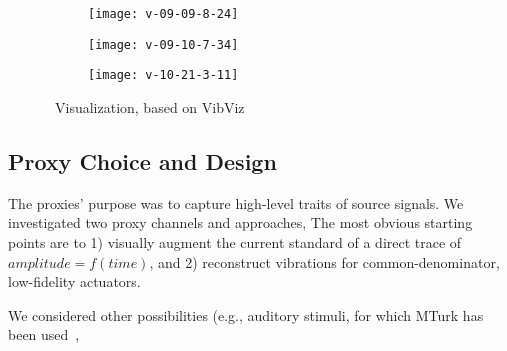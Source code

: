        \begin{figure}
        \centering
        \begin{subfigure}{0.15\textwidth}
            \centering
            \texttt{[image: v-09-09-8-24]}
        \end{subfigure}
        \begin{subfigure}{0.15\textwidth}
            \centering
            \texttt{[image: v-09-10-7-34]}
        \end{subfigure}
        \begin{subfigure}{0.15\textwidth}
            \centering
            \texttt{[image: v-10-21-3-11]}
        \end{subfigure}
        \caption{\original~Visualization, based on VibViz}
        \label{fig:vis:original}
    \end{figure}



\subsection{Proxy Choice and Design}
The proxies' purpose was to capture high-level traits of source signals. 
We investigated two proxy channels and approaches,  %
The most obvious starting points are to 
1) visually augment the current standard of a direct trace of $amplitude=f(time)$, and
2) reconstruct vibrations for common-denominator, low-fidelity actuators.

We considered other possibilities (e.g., auditory stimuli, for which MTurk  has been used~\cite{Cartwright2015},   





